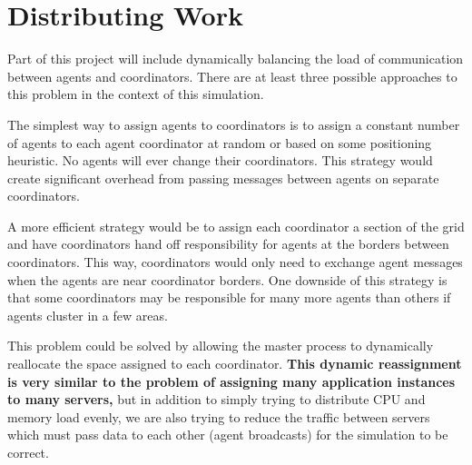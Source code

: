 \section{Distributing Work}

Part of this project will include dynamically balancing the load of communication between agents and
coordinators. There are at least three possible approaches to this problem in the context of this
simulation.

The simplest way to assign agents to coordinators is to assign a constant number of agents to each
agent coordinator at random or based on some positioning heuristic. No agents will ever change their
coordinators. This strategy would create significant overhead from passing messages between agents
on separate coordinators.

A more efficient strategy would be to assign each coordinator a section of the grid and have
coordinators hand off responsibility for agents at the borders between coordinators. This way,
coordinators would only need to exchange agent messages when the agents are near coordinator
borders. One downside of this strategy is that some coordinators may be responsible for many more
agents than others if agents cluster in a few areas.

This problem could be solved by allowing the master process to dynamically reallocate the space
assigned to each coordinator. \textbf{This dynamic reassignment is very similar to the problem of
assigning many application instances to many servers,} but in addition to simply trying to
distribute CPU and memory load evenly, we are also trying to reduce the traffic between servers
which must pass data to each other (agent broadcasts) for the simulation to be correct.

